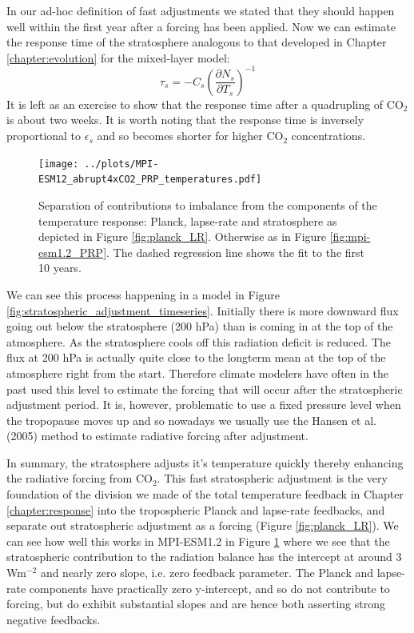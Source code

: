 \documentclass[12pt]{book}
\begin{document}
In our ad-hoc definition of fast adjustments we stated that they should happen well within the first year after a forcing has been applied. Now we can estimate the response time of the stratosphere analogous to that developed in Chapter \ref{chapter:evolution} for the mixed-layer model:
$$\tau_s = -C_s \left( \frac{\partial N_s}{\partial T_s}\right)^{-1}$$
It is left as an exercise to show that the response time after a quadrupling of CO$_2$ is about two weeks.  It is worth noting that the response time is inversely proportional to $\epsilon_s$ and so becomes shorter for higher CO$_2$ concentrations. 

\begin{figure}[!]
\begin{center}
\texttt{[image: ../plots/MPI-ESM12\_abrupt4xCO2\_PRP\_temperatures.pdf]}
\end{center}
\caption{ Separation of contributions to imbalance from the components of the temperature response: Planck, lapse-rate and stratosphere as depicted in Figure \ref{fig:planck_LR}. Otherwise as in Figure \ref{fig:mpi-esm1.2_PRP}. The dashed regression line shows the fit to the first 10 years. } 
\label{fig:mpi-esm1.2_PRP_temperatures}
\end{figure}

We can see this process happening in a model in Figure \ref{fig:stratospheric_adjustment_timeseries}. Initially there is more downward flux going out below the stratosphere (200 hPa) than is coming in at the top of the atmosphere. As the stratosphere cools off this radiation deficit is reduced. The flux at 200 hPa is actually quite close to the longterm mean at the top of the atmosphere right from the start. Therefore climate modelers have often in the past used this level to estimate the forcing that will occur after the stratospheric adjustment period. It is, however, problematic to use a fixed pressure level when the tropopause moves up and so nowadays we usually use the Hansen et al. (2005) method to estimate radiative forcing after adjustment. 

In summary, the stratosphere adjusts it's temperature quickly thereby enhancing the radiative forcing from CO$_2$. This fast stratospheric adjustment is the very foundation of the division we made of the total temperature feedback in Chapter \ref{chapter:response} into the tropospheric Planck and lapse-rate feedbacks, and separate out stratospheric adjustment as a forcing (Figure \ref{fig:planck_LR}). We can see how well this works in MPI-ESM1.2 in Figure \ref{fig:mpi-esm1.2_PRP_temperatures} where we see that the stratospheric contribution to the radiation balance has the intercept at around 3 Wm$^{-2}$ and nearly zero slope, i.e. zero feedback parameter. The Planck and lapse-rate components have practically zero y-intercept, and so do not contribute to forcing, but do exhibit substantial slopes and are hence both asserting strong negative feedbacks.
\end{document}
